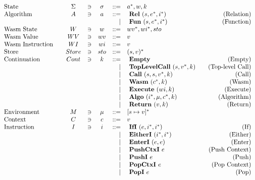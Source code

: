 \begin{align*}
\begin{array}{lcccrlr}
%
  \text{State}\quad& \Sigma &\ni& \sigma & ::=& \seq a, w, k \\
%
  \text{Algorithm}\quad& A &\ni& a &::=& ~ \rel ~ (s, \seq e, \seq i) &\quad\text{(Relation)} \\
  &&&& | & ~ \fun ~ (s, \seq e, \seq i) &\quad\text{(Function)} \\
%
  \text{Wasm State}\quad& W &\ni& w &::=& \seq{wv}, \seq{wi}, sto \\
  \text{Wasm Value}\quad& WV &\ni& wv &::=& v \\
  \text{Wasm Instruction}\quad& WI &\ni& wi &::=& v \\
%
  \text{Store}\quad& Store &\ni& sto &::=& \seq{(s, v)} \\
%
  \text{Continuation}\quad & Cont &\ni& k &::=& ~ \mt &\quad\text{(Empty)} \\
    &&&& | & ~ \toplevelcall ~ (s, \seq v, k) &\quad\text{(Top-level Call)} \\
    &&&& | & ~ \call ~ (s, s, \seq v, k) &\quad\text{(Call)} \\
    &&&& | & ~ \wasm ~ (\seq c, k) &\quad\text{(Wasm)} \\
    &&&& | & ~ \exe ~ (wi, k) &\quad\text{(Execute)} \\
    &&&& | & ~ \algo ~ (\seq i, \mu, \seq c, k) &\quad\text{(Algorithm)} \\
    &&&& | & ~ \ret ~ (v, k) &\quad\text{(Return)} \\
%
  \text{Environment}\quad& M &\ni& \mu &::=& \seq{[s \mapsto v]} \\
%
  \text{Context}\quad& C &\ni& c &::=& v \\
%
  \text{Instruction}\quad& I &\ni& i &::=& ~ \ifi ~ (e, \seq i, \seq i) &\quad\text{(If)} \\
    &&&& | & ~ \eitheri ~ (\seq i, \seq i) &\quad\text{(Either)} \\
    &&&& | & ~ \enteri ~ (e, e) &\quad\text{(Enter)} \\
    &&&& | & ~ \pushctxi ~ e &\quad\text{(Push Context)} \\
    &&&& | & ~ \pushi ~ e &\quad\text{(Push)} \\
    &&&& | & ~ \popctxi ~ e &\quad\text{(Pop Context)} \\
    &&&& | & ~ \popi ~ e &\quad\text{(Pop)} \\

\end{array}
\end{align*}
